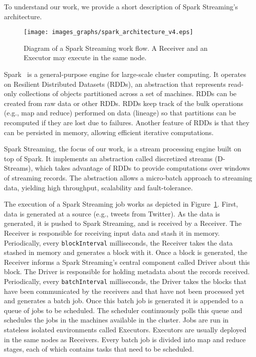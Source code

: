 %
To understand our work, we provide a short description of Spark Streaming's architecture.
\begin{figure}[t!]
  \begin{center}
    \texttt{[image: images\_graphs/spark\_architecture\_v4.eps]}
  \end{center}
  \caption{Diagram of a Spark Streaming work flow. A Receiver and an Executor may execute in the same node.}
  \label{fig:SparkStreaming_architecture}
\end{figure}

Spark~\cite{Spark} is a general-purpose engine for large-scale cluster computing. It operates on Resilient Distributed Datasets (RDDs), an abstraction that represents read-only collections of objects partitioned across a set of machines. RDDs can be created from raw data or other RDDs. 
RDDs keep track of the bulk operations (e.g., map and reduce) performed on data (lineage) so that partitions can be recomputed if they are lost due to failures. 
Another feature of RDDs is that they can be persisted in memory, allowing efficient iterative computations.

Spark Streaming, the focus of our work, is a stream processing engine built on top of Spark.
It implements an abstraction called discretized streams (D-Streams), which takes advantage of RDDs to provide computations over windows of streaming records.
The abstraction allows a micro-batch approach to streaming data, yielding high throughput, scalability and fault-tolerance.


The execution of a Spark Streaming job works as depicted in Figure~\ref{fig:SparkStreaming_architecture}. 
First, data is generated at a source (e.g., tweets from Twitter). As the data is generated, it is pushed to Spark Streaming, and is received by a Receiver. 
The Receiver is responsible for receiving input data and stash it in memory. Periodically, every \texttt{blockInterval} milliseconds, the Receiver takes the data stashed in memory and generates a block with it.
Once a block is generated, the Receiver informs a Spark Streaming's central component called Driver about this block. The Driver is responsible for holding metadata about the records received. 
Periodically, every \texttt{batchInterval} milliseconds, the Driver takes the blocks that have been communicated by the receivers and that have not been processed yet and generates a batch job. 
Once this batch job is generated it is appended to a queue of jobs to be scheduled. 
The scheduler continuously polls this queue and schedules the jobs in the machines available in the cluster.
Jobs are run in stateless isolated environments called Executors. Executors are usually deployed in the same nodes as Receivers.
Every batch job is divided into map and reduce stages, each of which contains tasks that need to be scheduled.

